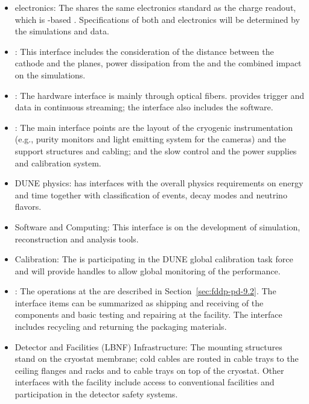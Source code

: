 \begin{itemize}

\item {} electronics: The  shares the same  electronics standard as the charge readout, which is -based \cite{utca}. Specifications of both  and  electronics will be determined by the simulations and  data.

\item {}: This interface includes the consideration of the distance between the cathode and the  planes, power dissipation from the  and the combined impact on the simulations.

\item {}: The hardware interface is mainly through optical fibers.   provides trigger and data in continuous streaming;  the interface also includes the  software.

\item {}: The main interface points are the layout of the cryogenic instrumentation (e.g., purity monitors and light emitting system for the cameras) and the  support structures and cabling; and the slow control and the  power supplies and calibration system.

\item DUNE physics: \dual {} has interfaces with the overall physics requirements on energy and time together with classification of events, decay modes and neutrino flavors.

\item Software and Computing: This interface is on the development of simulation, reconstruction and analysis tools.

\item Calibration: The  is participating in the DUNE global calibration task force and will provide handles to allow global monitoring of the  performance.

\item {}: The operations at the  are described in Section~\ref{sec:fddp-pd-9.2}. The interface items can be summarized as shipping and receiving of the  components and basic testing and repairing at the facility. The interface includes recycling and returning the packaging materials.

\item Detector and Facilities (LBNF) Infrastructure: The  %
 mounting structures stand on the cryostat membrane; cold cables are routed in cable trays to the ceiling \fdth flanges and racks and to cable trays on top of the cryostat. Other interfaces with the facility include access to conventional facilities and participation in the detector safety systems. 


\end{itemize}
